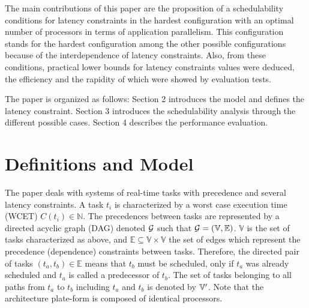 \documentclass{ijcaArticle}
\begin{document}
The main contributions of this paper are
the proposition of a schedulability conditions for latency constraints in the hardest configuration with an optimal number of processors in terms of application parallelism. This configuration stands for the hardest configuration among the other possible configurations because of the interdependence of latency constraints. Also, from these conditions, practical lower bounds  for latency constraints values were deduced, the efficiency and the rapidity of which were showed by evaluation tests.





The paper is organized as follows: Section 2 introduces the model and defines the latency constraint. Section 3 introduces the schedulability analysis  through the different possible cases. Section 4 describes the performance evaluation.

\section{Definitions and Model}\label{model}
The paper deals with systems of real-time tasks with precedence and several latency constraints. A task $t_i$ is characterized by a worst case execution time (WCET)
$C(t_i) \in {\mathbb N}$. The precedences between tasks are represented by a directed acyclic graph (DAG) denoted $\cal G$ such that ${\cal G}=(\mathbb{V},\mathbb{E})$. $\mathbb{V}$ is the
set of tasks characterized as above, and $\mathbb{E} \subseteq \mathbb{V}\times \mathbb{V}$ the set of edges which represent the precedence (dependence) constraints between tasks. Therefore, the directed pair of tasks $(t_a,t_b)\in \mathbb{E}$ means that $t_b$ must be scheduled, only if $t_a$ was already scheduled and $t_a$ is called a predecessor of $t_b$.  The set of tasks belonging to all paths from $t_a$ to $t_b$ including $t_a$
and $t_b$ is  denoted by ${\mathbb V}\rq{}$.  Note that the architecture plate-form is composed of identical processors.
  
\end{document}
